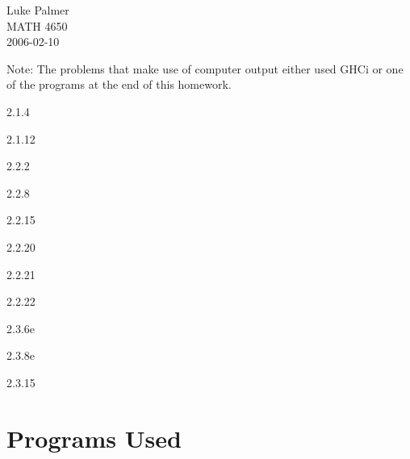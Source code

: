 \documentclass[12pt]{article}
\begin{document}
\noindent
Luke Palmer \\
MATH 4650 \\
2006-02-10

Note: The problems that make use of computer output either used GHCi or
one of the programs at the end of this homework.

\begin{description}
\item{2.1.4}    

\item{2.1.12}   

\item{2.2.2}    

\item{2.2.8}    

\item{2.2.15}   

\item{2.2.20}   

\item{2.2.21}   

\item{2.2.22}   

\item{2.3.6e}   

\item{2.3.8e}   

\item{2.3.15}   
\end{description}

\section*{Programs Used}
\end{document}
